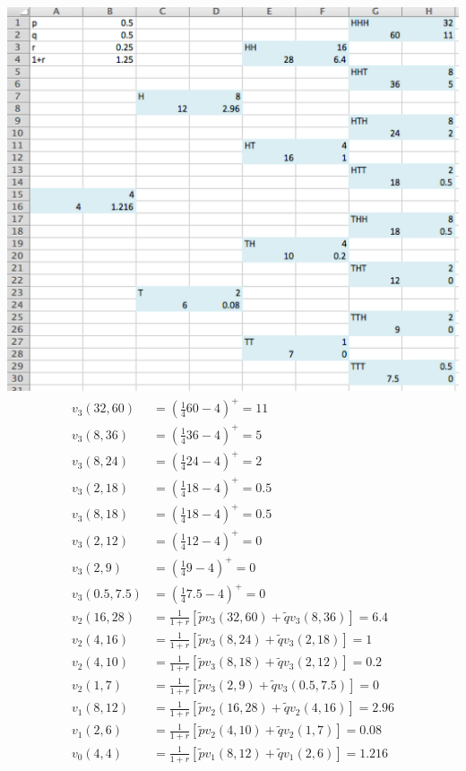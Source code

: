 \documentclass[12pt]{article}
\newenvironment{problem}[2][Problem]{\begin{trivlist}
		\item[\hskip \labelsep {\bfseries #1}\hskip \labelsep {\bfseries #2.}]}{\end{trivlist}}
\begin{document}
	\begin{problem}{8}\end{problem}
	\includegraphics[scale=0.6]{Ex1_8.png}\\
	\begin{align*}
	v_3(32,60) &= (\frac{1}{4}60-4)^+=11\\
	v_3(8,36) &= (\frac{1}{4}36-4)^+=5\\
	v_3(8,24) &= (\frac{1}{4}24-4)^+=2\\
	v_3(2,18) &= (\frac{1}{4}18-4)^+=0.5\\
	v_3(8,18) &= (\frac{1}{4}18-4)^+=0.5\\
	v_3(2,12) &= (\frac{1}{4}12-4)^+=0\\
	v_3(2,9) &= (\frac{1}{4}9-4)^+=0\\
	v_3(0.5,7.5) &= (\frac{1}{4}7.5-4)^+=0\\
	v_2(16,28) &= \frac{1}{1+r}[\tilde{p}v_3(32,60)+\tilde{q}v_3(8,36)] = 6.4\\
	v_2(4,16) &= \frac{1}{1+r}[\tilde{p}v_3(8,24)+\tilde{q}v_3(2,18)] = 1\\
	v_2(4,10) &= \frac{1}{1+r}[\tilde{p}v_3(8,18)+\tilde{q}v_3(2,12)] = 0.2\\
	v_2(1,7) &= \frac{1}{1+r}[\tilde{p}v_3(2,9)+\tilde{q}v_3(0.5,7.5)] = 0\\
	v_1(8,12) &= \frac{1}{1+r}[\tilde{p}v_2(16,28)+\tilde{q}v_2(4,16)] = 2.96\\
	v_1(2,6) &= \frac{1}{1+r}[\tilde{p}v_2(4,10)+\tilde{q}v_2(1,7)] = 0.08\\
	v_0(4,4) &= \frac{1}{1+r}[\tilde{p}v_1(8,12)+\tilde{q}v_1(2,6)] = 1.216
	\end{align*}
\end{document}
